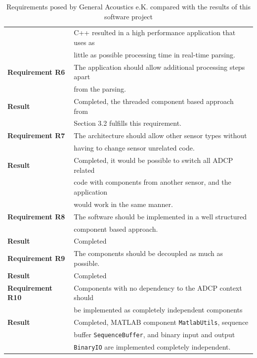 \begin{table}[!ht]
\begin{tabular}{|l|l|}
	  	& C++ resulted in a high performance application that uses as\\
	  	& little as possible processing time in real-time parsing. \\
	  \hline
	  \hline
	  	\textbf{Requirement R6} 
	  	& The application should allow additional processing steps apart\\
	  	& from the parsing.\\ \hline
	  	\textbf{Result} 
	  	& Completed, the threaded component based approach from\\
	  	& Section 3.2 fulfills this requirement.\\
	  \hline
	  \hline
	  	\textbf{Requirement R7} 
	  	& The architecture should allow other sensor types without\\
	  	& having to change sensor unrelated code.\\ \hline
	  	\textbf{Result} 
	  	& Completed, it would be possible to switch all ADCP related\\
	  	& code with components from another sensor, and the application\\
	  	& would work in the same manner.\\
	  \hline
	  \hline
	  	\textbf{Requirement R8} 
	  	& The software should be implemented in a well structured\\
	  	& component based approach.\\ \hline
	  	\textbf{Result} & Completed \\
	  \hline
	  \hline
	  	\textbf{Requirement R9} & The components should be decoupled as much as possible.\\ \hline
	  	\textbf{Result} & Completed \\
	  \hline
	  \hline
	  	\textbf{Requirement R10} 
	  	& Components with no dependency to the ADCP context should\\
	  	& be implemented as completely independent components\\ \hline
	  	\textbf{Result} 
	  	& Completed, MATLAB component \texttt{MatlabUtils}, sequence\\
	  	& buffer \texttt{SequenceBuffer}, and binary input and output\\
	  	& \texttt{BinaryIO} are implemented completely independent.\\
	  \hline
	\end{tabular}
	\caption{Requirements posed by General Acoustics e.K. compared with the results of this software project}
\end{table}

